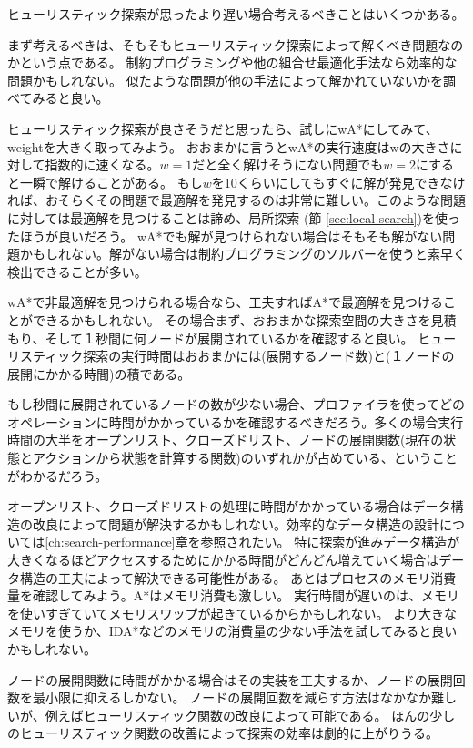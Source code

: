 ヒューリスティック探索が思ったより遅い場合考えるべきことはいくつかある。

まず考えるべきは、そもそもヒューリスティック探索によって解くべき問題なのかという点である。
制約プログラミングや他の組合せ最適化手法なら効率的な問題かもしれない。
似たような問題が他の手法によって解かれていないかを調べてみると良い。

ヒューリスティック探索が良さそうだと思ったら、試しにwA*にしてみて、weightを大きく取ってみよう。
おおまかに言うとwA*の実行速度はwの大きさに対して指数的に速くなる。$w=1$だと全く解けそうにない問題でも$w=2$にすると一瞬で解けることがある。
もし$w$を10くらいにしてもすぐに解が発見できなければ、おそらくその問題で最適解を発見するのは非常に難しい。このような問題に対しては最適解を見つけることは諦め、局所探索 (節 \ref{sec:local-search})を使ったほうが良いだろう。
wA*でも解が見つけられない場合はそもそも解がない問題かもしれない。解がない場合は制約プログラミングのソルバーを使うと素早く検出できることが多い。

wA*で非最適解を見つけられる場合なら、工夫すればA*で最適解を見つけることができるかもしれない。
その場合まず、おおまかな探索空間の大きさを見積もり、そして１秒間に何ノードが展開されているかを確認すると良い。
ヒューリスティック探索の実行時間はおおまかには(展開するノード数)と(１ノードの展開にかかる時間)の積である。

もし秒間に展開されているノードの数が少ない場合、プロファイラを使ってどのオペレーションに時間がかかっているかを確認するべきだろう。多くの場合実行時間の大半をオープンリスト、クローズドリスト、ノードの展開関数(現在の状態とアクションから状態を計算する関数)のいずれかが占めている、ということがわかるだろう。

オープンリスト、クローズドリストの処理に時間がかかっている場合はデータ構造の改良によって問題が解決するかもしれない。効率的なデータ構造の設計については\ref{ch:search-performance}章を参照されたい。
特に探索が進みデータ構造が大きくなるほどアクセスするためにかかる時間がどんどん増えていく場合はデータ構造の工夫によって解決できる可能性がある。
あとはプロセスのメモリ消費量を確認してみよう。A*はメモリ消費も激しい。
実行時間が遅いのは、メモリを使いすぎていてメモリスワップが起きているからかもしれない。
より大きなメモリを使うか、IDA*などのメモリの消費量の少ない手法を試してみると良いかもしれない。

ノードの展開関数に時間がかかる場合はその実装を工夫するか、ノードの展開回数を最小限に抑えるしかない。
ノードの展開回数を減らす方法はなかなか難しいが、例えばヒューリスティック関数の改良によって可能である。
ほんの少しのヒューリスティック関数の改善によって探索の効率は劇的に上がりうる。

